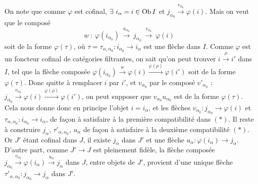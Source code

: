On note que comme $\varphi$ est cofinal, $\exists\ i_\alpha=i\in\operatorname{Ob} I$ et $j_{\alpha_0}\xrightarrow{v_{\alpha_0}}\varphi(i)$. Mais on veut que le composé
\[
w\ :\ \varphi(i_{\alpha_0})\ \xrightarrow{u_{\alpha_0}}\ j_{\alpha_0}\ \xrightarrow{v_{\alpha_0}}\ \varphi(i)
\]
soit de la forme $\varphi(\tau)$, où $\tau=\tau_{\alpha,\alpha_0}:i_{\alpha_0}\longrightarrow i_\alpha$ est une flèche dans $I$. Comme $\varphi$ est un foncteur cofinal de catégories filtrantes, on sait
qu'on peut trouver $i\xrightarrow{\rho}i'$ dans $I$, tel que la flèche composée $\varphi(i_{\alpha_0})\xrightarrow{w}\varphi(i)\xrightarrow{\varphi(\rho)}\varphi(i')$ soit de la forme $\varphi(\tau)$. Donc quitte à remplacer $i$ par $i'$, et $v_{\alpha_0}$ par le composé $v'_{\alpha_0}$ : $j_{\alpha_0}\xrightarrow{v_{\alpha_0}}\varphi(i)\xrightarrow{\varphi(\rho)}\varphi(i')$, on peut supposer que $v_{\alpha_0}u_{\alpha_0}$ est de la forme $\varphi(\tau)$. Cela nous donne donc en principe l'objet $i=i_\alpha$, et les flèches $v_{\alpha_0}:j_{\alpha_0}\longrightarrow\varphi(i)$ et $\tau_{\alpha,\alpha_0}:i_{\alpha_0}\longrightarrow i_\alpha$, de façon à satisfaire à la première compatibilité dans $(*)$. Il reste à construire $j_\alpha$, $\tau'_{\alpha,\alpha_0}$, $u_\alpha$ de façon à satisfaire à la deuxième compatibilité $(*)$. Or $J'$ étant cofinal dans $J$, il existe $j_\alpha$ dans $J'$ et une flèche $u_\alpha:\varphi(i_\alpha)\longrightarrow j_\alpha$. D'autre part, comme $J'\longrightarrow J$ est pleinement fidèle, la flèche composée $j_{\alpha_0}\xrightarrow{v_{\alpha_0}}\varphi(i_\alpha)\xrightarrow{u_\alpha}j_\alpha$ dans $J$, entre objets de $J'$, provient d'une unique flèche $\tau'_{\alpha,\alpha_0}:j_{\alpha_0}\longrightarrow j_\alpha$ dans $J'$.


